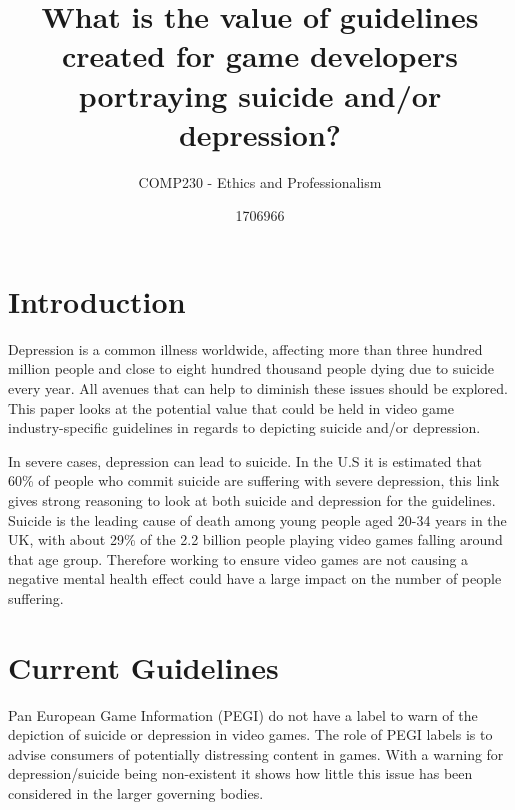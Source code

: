 \documentclass{scrartcl}
\title{What is the value of guidelines created for game developers portraying suicide and/or depression?}
\subtitle{COMP230 - Ethics and Professionalism}
\author{1706966}
\begin{document}
	
	\maketitle
	
	
	\section{Introduction}
		Depression is a common illness worldwide, affecting more than three hundred million people and close to eight hundred thousand people dying due to suicide every year\cite{DepressionStats}. All avenues that can help to diminish these issues should be explored. This paper looks at the potential value that could be held in video game industry-specific guidelines in regards to depicting suicide and/or depression.
		
		In severe cases, depression can lead to suicide. In the U.S it is estimated that 60\% of people who commit suicide are suffering with severe depression\cite{SuicideToDepression}, this link gives strong reasoning to look at both suicide and depression for the guidelines. Suicide is the leading cause of death among young people aged 20-34 years in the UK\cite{youngAge}, with about 29\%\cite{sales2018essential} of the 2.2 billion\cite{globalGame} people playing video games falling around that age group. Therefore working to ensure video games are not causing a negative mental health effect could have a large impact on the number of people suffering.
	
	\section{Current Guidelines}
		Pan European Game Information (PEGI) do not have a label to warn of the depiction of suicide or depression in video games\cite{pegiNoRating}. The role of PEGI labels is to advise consumers of potentially distressing content in games. With a warning for depression/suicide being non-existent it shows how little this issue has been considered in the larger governing bodies.
		
\end{document}
